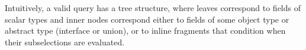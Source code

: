 Intuitively, a valid query has a tree structure, where leaves correspond to fields of scalar types and inner nodes correspond either to fields of some object type or abstract type (interface or union), or to inline fragments that condition when their subselections are evaluated. 

